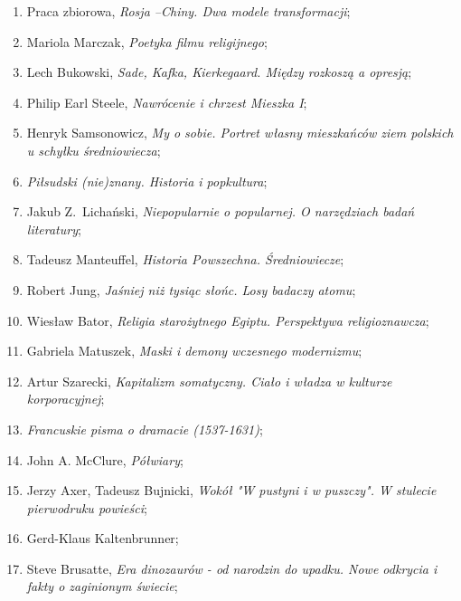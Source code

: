 \documentclass[a4paper,11pt]{article}
\begin{document}
\begin{enumerate}
\item Praca zbiorowa, \emph{Rosja --Chiny. Dwa modele transformacji};

\item Mariola Marczak, \emph{Poetyka filmu religijnego};

\item Lech Bukowski, \emph{Sade, Kafka, Kierkegaard. Między rozkoszą a
    opresją};

\item Philip Earl Steele, \emph{Nawrócenie i chrzest Mieszka I};

\item Henryk Samsonowicz, \emph{My o sobie. Portret własny mieszkańców
    ziem polskich u schyłku średniowiecza};

\item \emph{Piłsudski (nie)znany. Historia i popkultura};

\item Jakub Z.~Lichański, \emph{Niepopularnie o popularnej. O
    narzędziach badań literatury};

\item Tadeusz Manteuffel, \emph{Historia Powszechna. Średniowiecze};

\item Robert Jung, \emph{Jaśniej niż tysiąc słońc. Losy badaczy
    atomu};

\item Wiesław Bator, \emph{Religia starożytnego Egiptu. Perspektywa
    religioznawcza};

\item Gabriela Matuszek, \emph{Maski i demony wczesnego modernizmu};

\item Artur Szarecki, \emph{Kapitalizm somatyczny. Ciało i władza w
    kulturze korporacyjnej};

\item \emph{Francuskie pisma o dramacie (1537-1631)};

\item John A. McClure, \emph{Półwiary};

\item Jerzy Axer, Tadeusz Bujnicki, \emph{Wokół "W pustyni i w
    puszczy". W stulecie pierwodruku powieści};

\item Gerd-Klaus Kaltenbrunner;

\item Steve Brusatte, \emph{Era dinozaurów - od narodzin do upadku.
    Nowe odkrycia i fakty o zaginionym świecie};


\end{enumerate}
\end{document}
